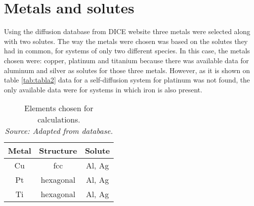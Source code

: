 \section{Metals and solutes}

Using the diffusion database from DICE website three metals were selected along with two solutes. The way the metals were chosen was based on the solutes they had in common, for systems of only two different species. In this case, the metals chosen were: copper, platinum and titanium because there was available data for aluminum and silver as solutes for those three metals. However, as it is shown on table \ref{tab:tabla2} data for a self-diffusion system for platinum was not found, the only available data were for systems in which iron is also present. 

\begin{table}[h]
    \centering
    \captionsetup{justification=centering}
    \begin{tabular}{ccc}
        Metal & Structure & Solute\\ \hline \hline
        Cu & fcc & Al, Ag \\
        Pt & hexagonal & Al, Ag \\
        Ti & hexagonal & Al, Ag \\
    \end{tabular}
    \caption{Elements chosen for calculations. \\ 
    \textit{Source: Adapted from \citep{kakusan} database.}}
    \label{tab:tabla1}
\end{table}


